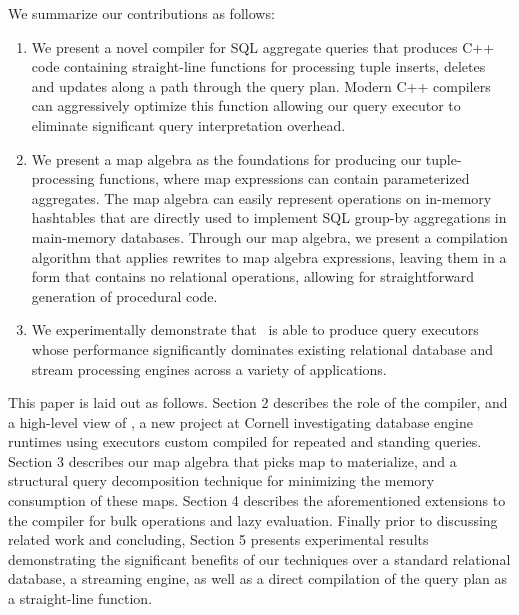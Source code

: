 We summarize our contributions as follows:

\begin{enumerate}
  \item We present a novel compiler for SQL aggregate queries that produces C++
code containing straight-line functions for processing tuple inserts, deletes
and updates along a path through the query plan. Modern C++ compilers can
aggressively optimize this function allowing our query executor to eliminate
significant query interpretation overhead.
  \item We present a map algebra as the foundations for producing our
tuple-processing functions, where map expressions can contain parameterized
aggregates. The map algebra can easily represent operations on in-memory
hashtables that are directly used to implement SQL group-by aggregations in
main-memory data\-ba\-ses. Through our map algebra, we present a compilation
algorithm that applies rewrites to map algebra expressions, leaving them in a
form that contains no relational operations, allowing for straightforward
generation of procedural code.
  \item We experimentally demonstrate that \compiler\ is able to produce query
executors whose performance significantly dominates existing relational database
and stream processing engines across a variety of applications.
\end{enumerate}


This paper is laid out as follows. Section 2 describes the role of the compiler,
and a high-level view of \compiler, a new project at Cornell investigating
database engine runtimes using executors custom compiled for repeated and
standing queries.    Section 3 describes our map algebra
that picks map to materialize, and a structural query decomposition technique
for minimizing the memory consumption of these maps. Section 4 describes the
aforementioned extensions to the compiler for bulk operations and lazy
evaluation. Finally prior to discussing related work and concluding, Section 5
presents experimental results demonstrating the significant benefits of our
techniques over a standard relational database, a streaming engine, as well as a
direct compilation of the query plan as a straight-line function.
